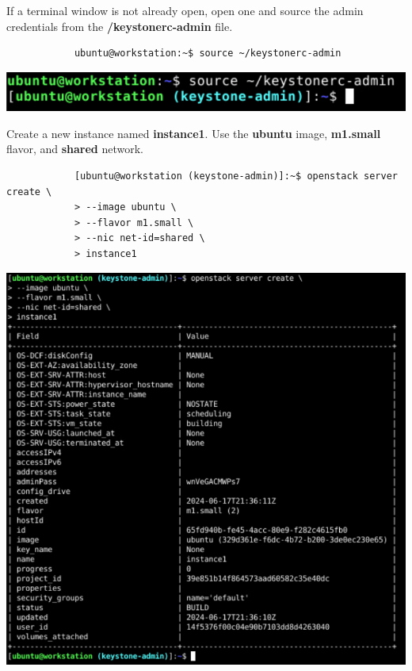\documentclass[letterpaper, 12pt]{article}
\begin{document}
\begin{enumerate}
    \begin{labstep}
        If a terminal window is not already open, open one and source the admin credentials from the \textbf{\texttildemid/keystonerc-admin} file.
        \begin{lstlisting}
            ubuntu@workstation:~$ source ~/keystonerc-admin
        \end{lstlisting}

        \begin{center}
            \includegraphics[width=\linewidth]{images/part3/step1.png}
        \end{center}
    \end{labstep}

    \begin{labstep}
        Create a new instance named \textbf{instance1}.
        Use the \textbf{ubuntu} image, \textbf{m1.small} flavor, and \textbf{shared} network.
        \begin{lstlisting}
            [ubuntu@workstation (keystone-admin)]:~$ openstack server create \
            > --image ubuntu \
            > --flavor m1.small \
            > --nic net-id=shared \
            > instance1
        \end{lstlisting}

        \begin{center}
            \includegraphics[width=\linewidth]{images/part3/step2.png}
        \end{center}
    \end{labstep}


\end{enumerate}
\end{document}
